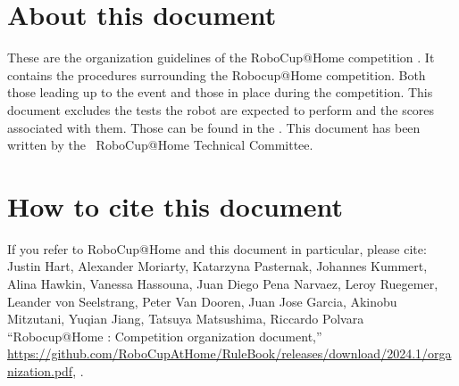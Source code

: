 
\section*{About this document}
These are the organization guidelines of the RoboCup@Home competition \YEAR. It contains the procedures surrounding the Robocup@Home competition. Both those leading up to the event and those in place during the competition. This document excludes the tests the robot are expected to perform and the scores associated with them. Those can be found in the \Rulebook.
This document has been written by the \YEAR ~RoboCup@Home Technical Committee.

\section*{How to cite this document}
If you refer to RoboCup@Home and this document in particular, please cite:\\

\noindent Justin Hart, Alexander Moriarty, Katarzyna Pasternak, Johannes Kummert,
Alina Hawkin, Vanessa Hassouna, Juan Diego Pena Narvaez, Leroy Ruegemer,
Leander von Seelstrang, Peter Van Dooren, Juan Jose Garcia, Akinobu Mitzutani,
Yuqian Jiang, Tatsuya Matsushima, Riccardo Polvara
\enquote{Robocup@Home \YEAR: Competition organization document,}
\url{https://github.com/RoboCupAtHome/RuleBook/releases/download/2024.1/organization.pdf}, \YEAR.

\begin{center}
	\begin{minipage}{0.8\textwidth}
		\footnotesize%
		
	\end{minipage}
\end{center}

\pagebreak